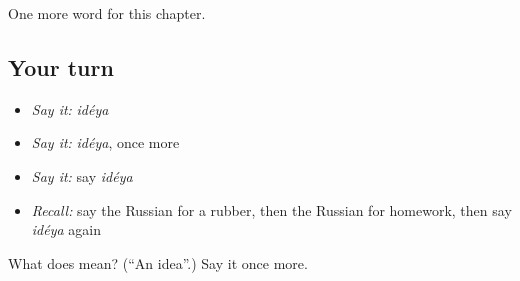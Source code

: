 \begin{grammarlens}[title={What you've built}]
One more word for this chapter.
\end{grammarlens}

\subsection*{Your turn}
\begin{itemize}
\raggedright
  \item \emph{Say it:} \emph{idéya}
  \item \emph{Say it:} \emph{idéya}, once more
  \item \emph{Say it:} say \emph{idéya}
  \item \emph{Recall:} say the Russian for a rubber, then the Russian for homework, then say \emph{idéya} again
\end{itemize}

\begin{tcolorbox}[breakable,colback=teal!4,colframe=teal!35!black,title={Before you move on}]
What does  mean? (\textquotedblleft{}An idea\textquotedblright{}.) Say it once more.
\end{tcolorbox}
